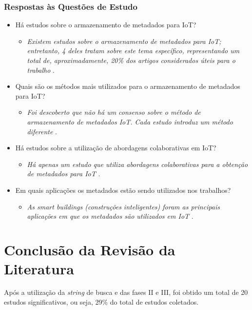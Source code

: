 \subsubsection{Respostas às Questões de Estudo}
\begin{itemize}
  \item Há estudos sobre o armazenamento de metadados para \acrlong{IoT}?
 \begin{itemize}
    \item \textit{Existem estudos sobre o armazenamento de metadados para \acrshort{IoT}; entretanto, 4 deles tratam
    sobre este tema específico, representando um total de, aproximadamente, 20\% dos artigos considerados úteis para o trabalho} \cite{armazenamento1} \cite{armazenamento2} \cite{armazenamento3} \cite{armazenamento4}.
  \end{itemize}
  \item Quais são os métodos mais utilizados para o armazenamento de metadados para \acrshort{IoT}?
    \begin{itemize}
    \item \textit{Foi descoberto que não há um consenso sobre o método de armazenamento de metadados \acrshort{IoT}. Cada estudo introduz um método diferente} \cite{armazenamento1} \cite{armazenamento2} \cite{armazenamento3} \cite{armazenamento4}.
  \end{itemize}
  \item Há estudos sobre a utilização de abordagens colaborativas em \acrlong{IoT}?
  \begin{itemize}
    \item \textit{Há apenas um estudo que utiliza abordagens colaborativas para a obtenção de metadados para \acrshort{IoT}} \cite{collaborative}.
  \end{itemize}
  \item Em quais aplicações os metadados estão sendo utilizados nos trabalhos?
  \begin{itemize}
    \item \textit{As smart buildings (construções inteligentes) foram as principais aplicações em que os metadados são utilizados em \acrshort{IoT}} \cite{collaborative} \cite{buildings1}.
  \end{itemize}
\end{itemize}

\section{Conclusão da Revisão da Literatura}
\quad Após a utilização da \textit{string} de busca e das fases II e III, foi obtido um total de 20 estudos significativos,
ou seja, 29\% do total de estudos coletados.




